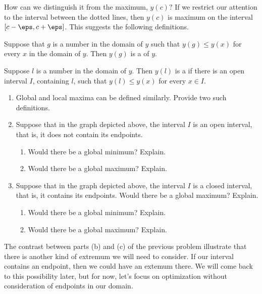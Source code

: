 How can we distinguish it from the  maximum, $y(c)?$ If we
restrict our attention to the interval between the dotted lines, then
$y(c)$ is maximum on the interval $[c-\eps, c+\eps]$.  This suggests
the following definitions.

\begin{mydefinition}
  Suppose that $g$ is a number in the domain of $y$ such
  that
  $y(g)\le y(x)$ for every $x$ in the domain of $y$.  Then $y(g)$ is a
   of $y$.
\end{mydefinition}

\begin{mydefinition}
  Suppose $l$ is a number in the domain of $y$.  Then $y(l)$ is a
   if there is an open interval $I$,  containing $l$, such that
  $y(l)\le y(x)$ for every $x\in I.$ 
\end{mydefinition}

\begin{embeddedproblem-enumerate}
  \begin{enumerate}[label={\bf{}(\alph*)}]
  \item Global and local maxima can be defined similarly. Provide two
    such definitions.
  \item Suppose that in the graph depicted above, the interval $I$ is an
    open interval, that is, it does not contain its endpoints.
    \begin{enumerate}
      \item     Would there be a global minimum?  Explain. 
      \item     Would there be a global maximum?  Explain.
    \end{enumerate}
  \item Suppose that in the graph depicted above, the interval $I$ is
      a closed interval, that is, it contains its endpoints.  Would
      there be a global maximum?  Explain.
    \begin{enumerate}
      \item     Would there be a global minimum?  Explain. 
      \item     Would there be a global maximum?  Explain.
    \end{enumerate}
  \end{enumerate}
\end{embeddedproblem-enumerate}

The contrast between parts (b) and (c) of the previous problem illustrate
that there is another kind of extremum we will need to consider.  If
our interval contains an endpoint, then we could have an extemum
there.  We will come back to this possibility later, but for now,
let’s focus on optimization without consideration of endpoints in our
domain.


